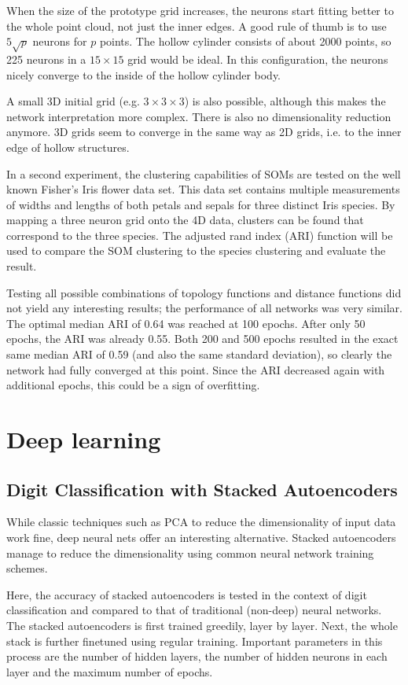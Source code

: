 \documentclass[a4, 10pt, twoside, twocolumn]{article}
\numberwithin{figure}{section}
\begin{document}
When the size of the prototype grid increases, the neurons start fitting better to the whole point cloud, not just the inner edges. A good rule of thumb is to use $5 \sqrt{p}$ neurons for $p$ points. The hollow cylinder consists of about 2000 points, so 225 neurons in a $15 \times 15$ grid would be ideal. In this configuration, the neurons nicely converge to the inside of the hollow cylinder body.

A small 3D initial grid (e.g. $3 \times 3 \times 3$) is also possible, although this makes the network interpretation more complex. There is also no dimensionality reduction anymore. 3D grids seem to converge in the same way as 2D grids, i.e. to the inner edge of hollow structures.

In a second experiment, the clustering capabilities of SOMs are tested on the well known Fisher's Iris flower data set. This data set contains multiple measurements of widths and lengths of both petals and sepals for three distinct Iris species. By mapping a three neuron grid onto the 4D data, clusters can be found that correspond to the three species. The adjusted rand index (ARI) function will be used to compare the SOM clustering to the species clustering and evaluate the result.

Testing all possible combinations of topology functions and distance functions did not yield any interesting results; the performance of all networks was very similar. The optimal median ARI of 0.64 was reached at 100 epochs. After only 50 epochs, the ARI was already 0.55. Both 200 and 500 epochs resulted in the exact same median ARI of 0.59 (and also the same standard deviation), so clearly the network had fully converged at this point. Since the ARI decreased again with additional epochs, this could be a sign of overfitting.

\section{Deep learning}
\subsection{Digit Classification with Stacked Autoencoders}
While classic techniques such as PCA to reduce the dimensionality of input data work fine, deep neural nets offer an interesting alternative. Stacked autoencoders manage to reduce the dimensionality using common neural network training schemes.

Here, the accuracy of stacked autoencoders is tested in the context of digit classification and compared to that of traditional (non-deep) neural networks. The stacked autoencoders is first trained greedily, layer by layer. Next, the whole stack is further finetuned using regular training. Important parameters in this process are the number of hidden layers, the number of hidden neurons in each layer and the maximum number of epochs.
\end{document}
